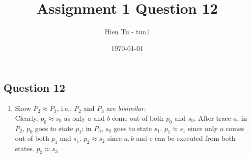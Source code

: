 \documentclass{article}
\title{Assignment 1 Question 12}
\author{Hien Tu - tun1}
\date{\today}
\begin{document}
\maketitle

\subsection*{Question 12}
\begin{enumerate}[label=\alph*.]
    \item Show $P_2 \approx P_3$, i.e., $P_2$ and $P_3$ are \emph{bisimilar}. \\
        Clearly, $p_0 \approx s_0$ as only $a$ and $b$ come out of both $p_0$ and
        $s_0$. After trace $a$, in $P_2$, $p_0$ goes to state $p_1$; in $P_3$, 
        $s_0$ goes to state $s_1$. $p_1 \approx s_1$ since only $a$ comes out of
        both $p_1$ and $s_1$. $p_2 \approx s_2$ since $a, b$ and $c$ can be
        executed from both states. $p_3 \approx s_3$

\end{enumerate}
\end{document}
